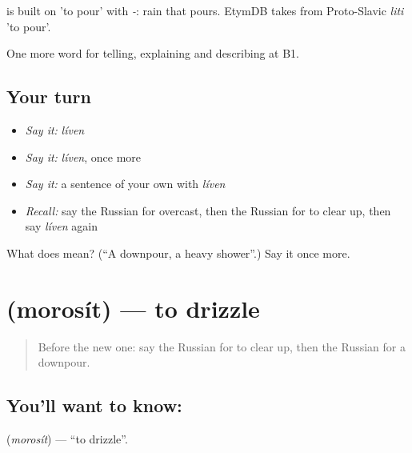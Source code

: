 \begin{cousinweb}
\emph{} is built on \emph{} 'to pour' with \emph{-}: rain that pours. EtymDB takes \emph{} from Proto-Slavic \emph{liti} 'to pour'.
\end{cousinweb}

\begin{grammarlens}[title={What you've built}]
One more word for telling, explaining and describing at B1.
\end{grammarlens}

\subsection*{Your turn}
\begin{itemize}
\raggedright
  \item \emph{Say it:} \emph{líven}
  \item \emph{Say it:} \emph{líven}, once more
  \item \emph{Say it:} a sentence of your own with \emph{líven}
  \item \emph{Recall:} say the Russian for overcast, then the Russian for to clear up, then say \emph{líven} again
\end{itemize}

\begin{tcolorbox}[breakable,colback=teal!4,colframe=teal!35!black,title={Before you move on}]
What does  mean? (\textquotedblleft{}A downpour, a heavy shower\textquotedblright{}.) Say it once more.
\end{tcolorbox}
\section[\texorpdfstring{\ru{моросить} (morosít)}{моросить (morosít)}]{ (morosít) — to drizzle}

\label{lesson:RU-C465-morosit}



\begin{quote}
Before the new one: say the Russian for to clear up, then the Russian for a downpour.
\end{quote}

\subsection*{You'll want to know: }
\textbf{} (\emph{morosít}) — \textquotedblleft{}to drizzle\textquotedblright{}.

